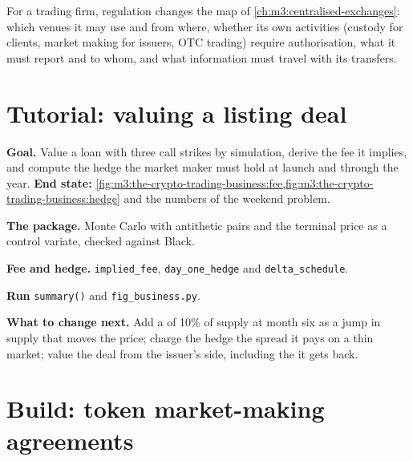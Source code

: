 For a trading firm, regulation changes the map of \cref{ch:m3:centralised-exchanges}: which venues it may use and from where, whether its own activities (custody
for clients, market making for issuers, OTC trading) require authorisation, what it must report and to whom, and what information must travel with its
transfers.

\section{Tutorial: valuing a listing deal}\label{tut:m3:the-crypto-trading-business:deal}

\begin{tutorial}
\textbf{Goal.} Value a  loan with three call strikes by simulation, derive the fee it implies, and compute the hedge the market maker must hold at launch
and through the year. \textbf{End state:} \cref{fig:m3:the-crypto-trading-business:fee,fig:m3:the-crypto-trading-business:hedge} and the numbers of the
weekend problem.
\begin{tutsteps}
\item \textbf{The package.} Monte Carlo with antithetic pairs and the terminal price as a control variate, checked against Black.
\label{lst:m3:the-crypto-trading-business:mc}
\item \textbf{Fee and hedge.} \texttt{implied\_fee}, \texttt{day\_one\_hedge} and \texttt{delta\_schedule}.
\label{lst:m3:the-crypto-trading-business:hedge}
\item \textbf{Run} \texttt{summary()} and \texttt{fig\_business.py}.
\end{tutsteps}
\textbf{What to change next.} Add a  of 10\% of supply at month six as a jump in supply that moves the price; charge the hedge the spread it pays
on a thin market; value the deal from the issuer's side, including the  it gets back.
\end{tutorial}

\section{Build: token market-making agreements}\label{bld:m3:the-crypto-trading-business:tokenloan}

